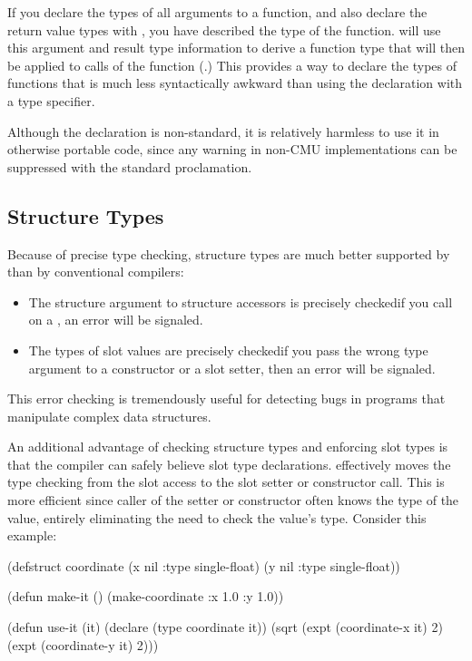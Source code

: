 If you declare the types of all arguments to a function, and also
declare the return value types with , you have described
the type of the function.  \python{} will use this argument and result
type information to derive a function type that will then be applied
to calls of the function (.)  This provides a
way to declare the types of functions that is much less syntactically
awkward than using the  declaration with a 
type specifier.

Although the  declaration is non-standard, it is
relatively harmless to use it in otherwise portable code, since any
warning in non-CMU implementations can be suppressed with the standard
 proclamation.


\subsection{Structure Types}
\label{structure-types}

Because of precise type checking, structure types are much better
supported by \python{} than by conventional compilers:

\begin{itemize}  
\item The structure argument to structure accessors is precisely
  checked\dash{}if you call  on a , an error
  will be signaled.
  
\item The types of slot values are precisely checked\dash{}if you pass
  the wrong type argument to a constructor or a slot setter, then an
  error will be signaled.
\end{itemize}

This error checking is tremendously useful for detecting bugs in
programs that manipulate complex data structures.

An additional advantage of checking structure types and enforcing slot
types is that the compiler can safely believe slot type declarations.
\python{} effectively moves the type checking from the slot access to
the slot setter or constructor call.  This is more efficient since
caller of the setter or constructor often knows the type of the value,
entirely eliminating the need to check the value's type.  Consider
this example:

\begin{lisp}
(defstruct coordinate
  (x nil :type single-float)
  (y nil :type single-float))

(defun make-it ()
  (make-coordinate :x 1.0 :y 1.0))

(defun use-it (it)
  (declare (type coordinate it))
  (sqrt (expt (coordinate-x it) 2) (expt (coordinate-y it) 2)))
\end{lisp}

